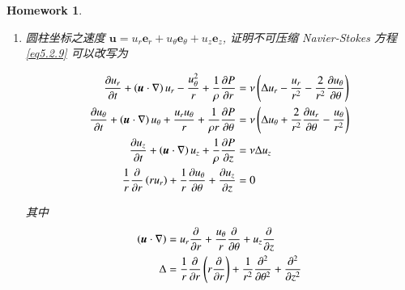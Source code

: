 \documentclass[11pt]{article}
\newtheorem{homework}{Homework}[section]
\begin{document}
\begin{homework}
	\text{}
	
	\vspace{-0.5cm}
	
	\begin{enumerate}
		\item 圆柱坐标之速度 $ \boldsymbol{u} = u_{r}\boldsymbol{e}_{r} + u_{\theta}\boldsymbol{e}_{\theta} + u_{z}\boldsymbol{e}_{z} $, 证明不可压缩 Navier-Stokes 方程 \ref{eq5.2.9} 可以改写为
		
		\begin{equation}
		\begin{split}
		\frac{{\partial {u_r}}}{{\partial t}} + \left( {\boldsymbol{u} \cdot \nabla } \right){u_r} - \frac{{u_\theta ^2}}{r} + \frac{1}{\rho }\frac{{\partial P}}{{\partial r}} & = \nu \left( {\Delta {u_r} - \frac{{{u_r}}}{{{r^2}}} - \frac{2}{{{r^2}}}\frac{{\partial {u_\theta }}}{{\partial \theta }}} \right)\\
		\frac{{\partial {u_\theta }}}{{\partial t}} + \left( {\boldsymbol{u} \cdot \nabla } \right){u_\theta } + \frac{{{u_r}{u_\theta }}}{r} + \frac{1}{{\rho r}}\frac{{\partial P}}{{\partial \theta }} & = \nu \left( {\Delta {u_\theta } + \frac{2}{{{r^2}}}\frac{{\partial {u_r}}}{{\partial \theta }} - \frac{{{u_\theta }}}{{{r^2}}}} \right)\\
		\frac{{\partial {u_z}}}{{\partial t}} + \left( {\boldsymbol{u} \cdot \nabla } \right){u_z} + \frac{1}{\rho }\frac{{\partial P}}{{\partial z}} & = \nu \Delta {u_z}\\
		\frac{1}{r}\frac{\partial }{{\partial r}}\left( {r{u_r}} \right) + \frac{1}{r}\frac{{\partial {u_\theta }}}{{\partial \theta }} + \frac{{\partial {u_z}}}{{\partial z}} & = 0
		\end{split}
		\notag 
		\end{equation}
		
		其中 
		\begin{equation}
		\begin{split}
		\left( {\boldsymbol{u} \cdot \nabla } \right) & = {u_r}\frac{\partial }{{\partial r}} + \frac{{{u_\theta }}}{r}\frac{\partial }{{\partial \theta }} + {u_z}\frac{\partial }{{\partial z}}\\
		\Delta  & = \frac{1}{r}\frac{\partial }{{\partial r}}\left( {r\frac{\partial }{{\partial r}}} \right) + \frac{1}{{{r^2}}}\frac{{{\partial ^2}}}{{\partial {\theta ^2}}} + \frac{{{\partial ^2}}}{{\partial {z^2}}}
		\end{split}
		\notag 
		\end{equation}
		

\end{enumerate}
\end{homework}
\end{document}
